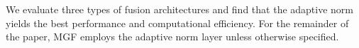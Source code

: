 
We evaluate three types of fusion architectures and find that the adaptive norm yields the best performance and computational efficiency. For the remainder of the paper, MGF employs the adaptive norm layer unless otherwise specified.





